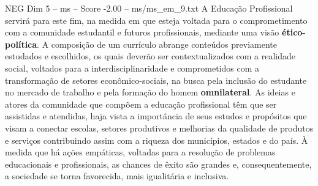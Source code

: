 \begin{textsample}{NEG Dim 5 – ms – Score -2.00 – ms/ms\_em\_9.txt}
A Educação Profissional servirá para este fim, na medida em que esteja voltada para o comprometimento com a comunidade estudantil e futuros profissionais, mediante uma visão \textbf{ético-política}.
A composição de um currículo abrange conteúdos previamente estudados e escolhidos, os quais deverão ser contextualizados com a realidade social, voltados para a interdisciplinaridade e comprometidos com a transformação de setores econômico-sociais, na busca pela inclusão do estudante no mercado de trabalho e pela formação do homem \textbf{omnilateral}.
As ideias e atores da comunidade que compõem a educação profissional têm que ser assistidas e atendidas, haja vista a importância de seus estudos e propósitos que visam a conectar escolas, setores produtivos e melhorias da qualidade de produtos e serviços contribuindo assim com a riqueza dos municípios, estados e do país.
À medida que há ações empáticas, voltadas para a resolução de problemas educacionais e profissionais, as chances de êxito são grandes e, consequentemente, a sociedade se torna favorecida, mais igualitária e inclusiva.

\end{textsample}
